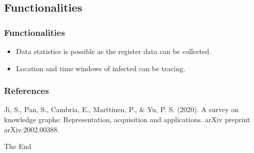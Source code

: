 \documentclass{beamer}
\begin{document}
\subsection{Functionalities}
\begin{frame}
  \frametitle{Functionalities}
  \begin{itemize}
    \item Data statistics is possible as the register data can be collected.
    \item Location and time windows of infected can be tracing.
  \end{itemize}

\end{frame}

\begin{frame}[allowframebreaks]
  \frametitle{References}
  \footnotesize{
  \begin{thebibliography}{99} %
      Ji, S., Pan, S., Cambria, E., Marttinen, P., \& Yu, P. S.  (2020). 
      \newblock A survey on knowledge graphs: Representation, acquisition and applications.
      \newblock arXiv preprint arXiv:2002.00388.
      
  
      \end{thebibliography}
  }
  \end{frame}

\begin{frame}
\Huge{\centerline{The End}}
\end{frame}

\end{document}
